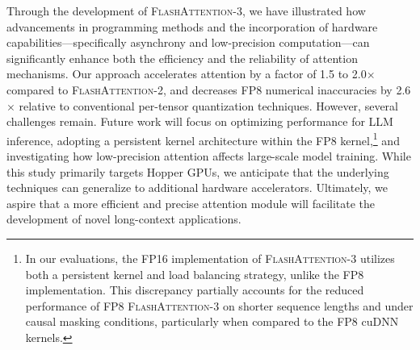 Through the development of \textsc{FlashAttention-3}, we have illustrated how advancements in programming methods and the incorporation of hardware capabilities—specifically asynchrony and low-precision computation—can significantly enhance both the efficiency and the reliability of attention mechanisms. Our approach accelerates attention by a factor of 1.5 to 2.0$\times$ compared to \textsc{FlashAttention-2}, and decreases FP8 numerical inaccuracies by 2.6$\times$ relative to conventional per-tensor quantization techniques. However, several challenges remain. Future work will focus on optimizing performance for LLM inference, adopting a persistent kernel architecture within the FP8 kernel,\footnote{In our evaluations, the FP16 implementation of \textsc{FlashAttention-3} utilizes both a persistent kernel and load balancing strategy, unlike the FP8 implementation. This discrepancy partially accounts for the reduced performance of FP8 \textsc{FlashAttention-3} on shorter sequence lengths and under causal masking conditions, particularly when compared to the FP8 cuDNN kernels.} and investigating how low-precision attention affects large-scale model training. While this study primarily targets Hopper GPUs, we anticipate that the underlying techniques can generalize to additional hardware accelerators. Ultimately, we aspire that a more efficient and precise attention module will facilitate the development of novel long-context applications.

